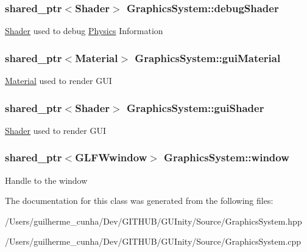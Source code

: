 \subsubsection[{debug\+Shader}]{\setlength{\rightskip}{0pt plus 5cm}shared\+\_\+ptr$<${\bf Shader}$>$ Graphics\+System\+::debug\+Shader\hspace{0.3cm}{\ttfamily [protected]}}\label{class_graphics_system_a4598a940b017484e0c05f8b8d29eada0}
\hyperlink{class_shader}{Shader} used to debug \hyperlink{class_physics}{Physics} Information \hypertarget{class_graphics_system_afec79bbb5e358ea7f02ad7110017f333}{}
\subsubsection[{gui\+Material}]{\setlength{\rightskip}{0pt plus 5cm}shared\+\_\+ptr$<${\bf Material}$>$ Graphics\+System\+::gui\+Material\hspace{0.3cm}{\ttfamily [protected]}}\label{class_graphics_system_afec79bbb5e358ea7f02ad7110017f333}
\hyperlink{class_material}{Material} used to render G\+U\+I \hypertarget{class_graphics_system_aba28cabec543d87fa086bf64c41a7d1e}{}
\subsubsection[{gui\+Shader}]{\setlength{\rightskip}{0pt plus 5cm}shared\+\_\+ptr$<${\bf Shader}$>$ Graphics\+System\+::gui\+Shader\hspace{0.3cm}{\ttfamily [protected]}}\label{class_graphics_system_aba28cabec543d87fa086bf64c41a7d1e}
\hyperlink{class_shader}{Shader} used to render G\+U\+I \hypertarget{class_graphics_system_af64c8566c04ec068df5c50755b46e034}{}
\subsubsection[{window}]{\setlength{\rightskip}{0pt plus 5cm}shared\+\_\+ptr$<$G\+L\+F\+Wwindow$>$ Graphics\+System\+::window\hspace{0.3cm}{\ttfamily [protected]}}\label{class_graphics_system_af64c8566c04ec068df5c50755b46e034}
Handle to the window 

The documentation for this class was generated from the following files\+:\begin{DoxyCompactItemize}
\item 
/\+Users/guilherme\+\_\+cunha/\+Dev/\+G\+I\+T\+H\+U\+B/\+G\+U\+Inity/\+Source/Graphics\+System.\+hpp\item 
/\+Users/guilherme\+\_\+cunha/\+Dev/\+G\+I\+T\+H\+U\+B/\+G\+U\+Inity/\+Source/Graphics\+System.\+cpp\end{DoxyCompactItemize}
